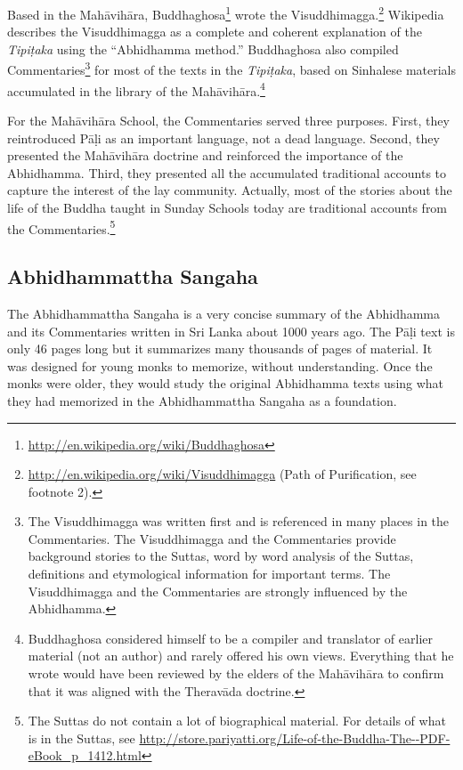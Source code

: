 Based in the Mahāvihāra, Buddhaghosa\footnote{\url{http://en.wikipedia.org/wiki/Buddhaghosa}} wrote the Visuddhimagga.\footnote{\url{http://en.wikipedia.org/wiki/Visuddhimagga} (Path of Purification, see footnote 2).} Wikipedia describes the Visuddhimagga as a complete and coherent explanation of the \textit{Tipiṭaka} using the “Abhidhamma method.” Buddhaghosa also compiled Commentaries\footnote{The Visuddhimagga was written first and is referenced in many places in the Commentaries. The Visuddhimagga and the Commentaries provide background stories to the Suttas, word by word analysis of the Suttas, definitions and etymological information for important terms. The Visuddhimagga and the Commentaries are strongly influenced by the Abhidhamma.} for most of the texts in the \textit{Tipiṭaka}, based on Sinhalese materials accumulated in the library of the Mahāvihāra.\footnote{Buddhaghosa considered himself to be a compiler and translator of earlier material (not an author) and rarely offered his own views. Everything that he wrote would have been reviewed by the elders of the Mahāvihāra to confirm that it was aligned with the Theravāda doctrine.}

For the Mahāvihāra School, the Commentaries served three purposes. First, they reintroduced Pāḷi as an important language, not a dead language. Second, they presented the Mahāvihāra doctrine and reinforced the importance of the Abhidhamma. Third, they presented all the accumulated traditional accounts to capture the interest of the lay community. Actually, most of the stories about the life of the Buddha taught in Sunday Schools today are traditional accounts from the Commentaries.\footnote{The Suttas do not contain a lot of biographical material. For details of what is in the Suttas, see \url{http://store.pariyatti.org/Life-of-the-Buddha-The--PDF-eBook_p_1412.html}}

\subsection*{Abhidhammattha Sangaha}

The Abhidhammattha Sangaha is a very concise summary of the Abhidhamma and its Commentaries written in Sri Lanka about 1000 years ago. The Pāḷi text is only 46 pages long but it summarizes many thousands of pages of material. It was designed for young monks to memorize, without understanding. Once the monks were older, they would study the original Abhidhamma texts using what they had memorized in the Abhidhammattha Sangaha as a foundation. 

